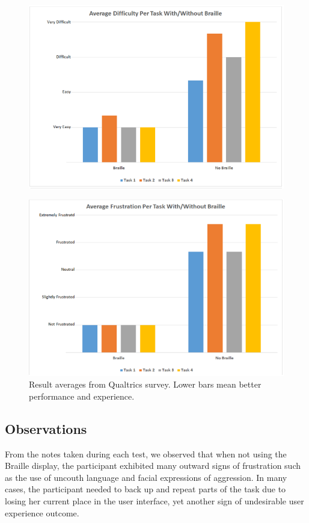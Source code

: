 \documentclass[11.5pt]{sig-alternate} %
\begin{document}
\begin{large}
\begin{figure}[!h]
    \centering
    \includegraphics[width=1\linewidth]{images/fig5a.png}
\end{figure}
\begin{figure}[!h]
    \centering
     \includegraphics[width=1\linewidth]{images/fig5b.png}
    \caption{Result averages from Qualtrics survey. Lower bars mean better performance and experience.}
    
\end{figure}

\subsection*{Observations}

From the notes taken during each test, we observed that when not using the Braille display, the participant exhibited many outward signs of frustration such as the use of uncouth language and facial expressions of aggression. In many cases, the participant needed to back up and repeat parts of the task due to losing her current place in the user interface, yet another sign of undesirable user experience outcome. 


\end{large}
\end{document}
